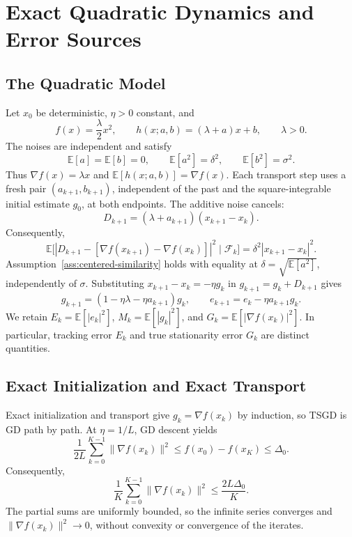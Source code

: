 \section{Exact Quadratic Dynamics and Error Sources}
\label{app:quadratic-dynamics}
\label{sec:two-error-sources}

\subsection{The Quadratic Model}
\label{subsec:quadratic-model}

Let $x_0$ be deterministic, $\eta>0$ constant, and
\begin{equation}
\label{eq:quadratic-noise-model}
f(x)=\frac\lambda2x^2,\qquad
h(x;a,b)=(\lambda+a)x+b,\qquad \lambda>0.
\end{equation}
The noises are independent and satisfy
\[
\mathbb E[a]=\mathbb E[b]=0,\qquad
\mathbb E[a^2]=\delta^2,\qquad \mathbb E[b^2]=\sigma^2.
\]
Thus $\nabla f(x)=\lambda x$ and $\mathbb E[h(x;a,b)]=\nabla f(x)$.
Each transport step uses a fresh pair $(a_{k+1},b_{k+1})$,
independent of the past and the square-integrable initial estimate
$g_0$, at both endpoints. The additive noise cancels:
\begin{equation}
\label{eq:quadratic-coupled-difference}
D_{k+1}=(\lambda+a_{k+1})(x_{k+1}-x_k).
\end{equation}
Consequently,
\[
\mathbb E\bigl[|D_{k+1}-[\nabla f(x_{k+1})-\nabla f(x_k)]|^2
       \mid\mathcal F_k\bigr]
=\delta^2|x_{k+1}-x_k|^2.
\]
Assumption~\ref{ass:centered-similarity} holds with equality at
$\delta=\sqrt{\mathbb E[a^2]}$, independently of $\sigma$.
Substituting $x_{k+1}-x_k=-\eta g_k$ in $g_{k+1}=g_k+D_{k+1}$
gives
\begin{equation}
\label{eq:quadratic-core-recursions}
g_{k+1}=(1-\eta\lambda-\eta a_{k+1})g_k,
\qquad e_{k+1}=e_k-\eta a_{k+1}g_k.
\end{equation}
We retain $E_k=\mathbb E[|e_k|^2]$, $M_k=\mathbb E[|g_k|^2]$,
and $G_k=\mathbb E[|\nabla f(x_k)|^2]$. In particular, tracking
error $E_k$ and true stationarity error $G_k$ are distinct quantities.

\subsection{Exact Initialization and Exact Transport}
\label{subsec:exact-init-exact-transport}

Exact initialization and transport give $g_k=\nabla f(x_k)$ by
induction, so TSGD is GD path by path. At $\eta=1/L$, GD descent yields
\[
\frac1{2L}\sum_{k=0}^{K-1}\|\nabla f(x_k)\|^2
\leq f(x_0)-f(x_K)\leq\Delta_0.
\]
Consequently,
\begin{equation}
\label{eq:exact-transport-gd-bound}
\frac1K\sum_{k=0}^{K-1}\|\nabla f(x_k)\|^2\leq\frac{2L\Delta_0}{K}.
\end{equation}
The partial sums are uniformly bounded, so the infinite series
converges and $\|\nabla f(x_k)\|^2\to0$, without convexity or
convergence of the iterates.

